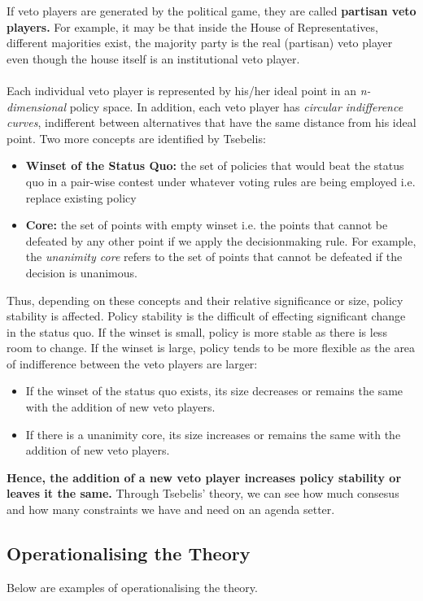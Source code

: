 \documentclass[12pt, letterpaper]{article}
\begin{document}
If veto players are generated by the political game, they are called \textbf{partisan veto players.} For example, it may be that inside the House of Representatives, different majorities exist, the majority party is the real (partisan) veto player even though the house itself is an institutional veto player.\\\\
Each individual veto player is represented by his/her ideal point in an \textit{n-dimensional} policy space. In addition, each veto player has \textit{circular indifference curves}, indifferent between alternatives that have the same distance from his ideal point.
Two more concepts are identified by Tsebelis:
\begin{itemize}
	\item \textbf{Winset of the Status Quo:} the set of policies that would beat the status quo in a pair-wise contest under whatever voting rules are being employed i.e. replace existing policy
	\item \textbf{Core:} the set of points with empty winset i.e. the points that cannot be defeated by any other point if we apply the decisionmaking rule. For example, the \textit{unanimity core} refers to the set of points that cannot be defeated if the decision is unanimous.
\end{itemize}
Thus, depending on these concepts and their relative significance or size, policy stability is affected. Policy stability is the difficult of effecting significant change in the status quo. If the winset is small, policy is more stable as there is less room to change. If the winset is large, policy tends to be more flexible as the area of indifference between the veto players are larger:
\begin{itemize}
	\item If the winset of the status quo exists, its size decreases or remains the same with the addition of new veto players.
	\item If there is a unanimity core, its size increases or remains the same with the addition of new veto players.

\end{itemize}

\textbf{Hence, the addition of a new veto player increases policy stability or leaves it the same.} Through Tsebelis' theory, we can see how much consesus and how many constraints we have and need on an agenda setter.

\subsection{Operationalising the Theory}
Below are examples of operationalising the theory.
\end{document}
